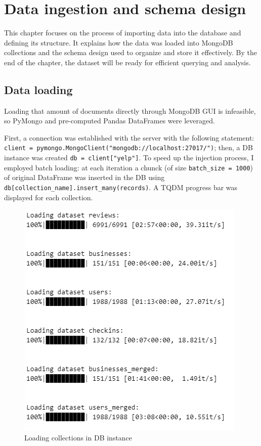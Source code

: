 \documentclass{Configuration_Files/PoliMi3i_thesis}
\begin{document}
\bigskip

\cleardoublepage

\chapter{Data ingestion and schema design}
This chapter focuses on the process of importing data into the database and defining its structure. It explains how the data was loaded into MongoDB collections and the schema design used to organize and store it effectively. By the end of the chapter, the dataset will be ready for efficient querying and analysis.

\section{Data loading}
Loading that amount of documents directly through MongoDB GUI is infeasible, so PyMongo and pre-computed Pandas DataFrames were leveraged. 

First, a connection was established with the server with the following statement: \\
\verb|client = pymongo.MongoClient("mongodb://localhost:27017/")|; then, a DB instance was created \verb|db = client["yelp"]|. 
To speed up the injection process, I employed batch loading: at each iteration a chunck (of size \texttt{batch\_size = 1000}) of original DataFrame was inserted in the DB using \texttt{db[collection\_name].insert\_many(records)}. A TQDM progress bar was displayed for each collection.

\bigskip

\begin{figure}[H]
    \centering
    \includegraphics[width=1\columnwidth / 2]{imgs/injection_process.png}
    \caption{Loading collections in DB instance}
    \label{fig:injection_process}
\end{figure}
\end{document}
